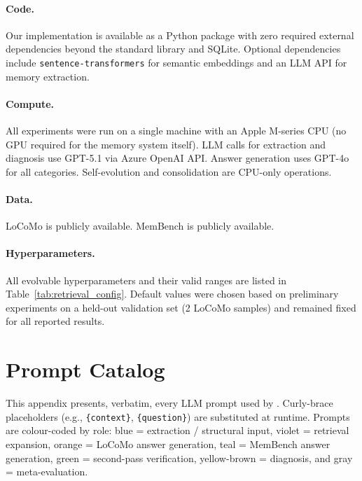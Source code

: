 \paragraph{Code.} Our implementation is available as a Python package with zero required external dependencies beyond the standard library and SQLite. Optional dependencies include \texttt{sentence-transformers} for semantic embeddings and an LLM API for memory extraction.

\paragraph{Compute.} All experiments were run on a single machine with an Apple M-series CPU (no GPU required for the memory system itself). LLM calls for extraction and diagnosis use GPT-5.1 via Azure OpenAI API. Answer generation uses GPT-4o for all categories. Self-evolution and consolidation are CPU-only operations.

\paragraph{Data.} LoCoMo \citep{maharana2024evaluating} is publicly available. MemBench \citep{membench2025} is publicly available.

\paragraph{Hyperparameters.} All evolvable hyperparameters and their valid ranges are listed in Table~\ref{tab:retrieval_config}. Default values were chosen based on preliminary experiments on a held-out validation set (2 LoCoMo samples) and remained fixed for all reported results.

\section{Prompt Catalog}
\label{app:prompts}

This appendix presents, verbatim, every LLM prompt used by \ours{}. Curly-brace placeholders (e.g., \texttt{\{context\}}, \texttt{\{question\}}) are substituted at runtime. Prompts are colour-coded by role: \textcolor{blue!70}{blue} = extraction / structural input, \textcolor{violet!70}{violet} = retrieval expansion, \textcolor{orange!80}{orange} = LoCoMo answer generation, \textcolor{teal!70!black}{teal} = MemBench answer generation, \textcolor{green!55!black}{green} = second-pass verification, \textcolor{yellow!50!brown}{yellow-brown} = diagnosis, and \textcolor{gray!70!black}{gray} = meta-evaluation.

